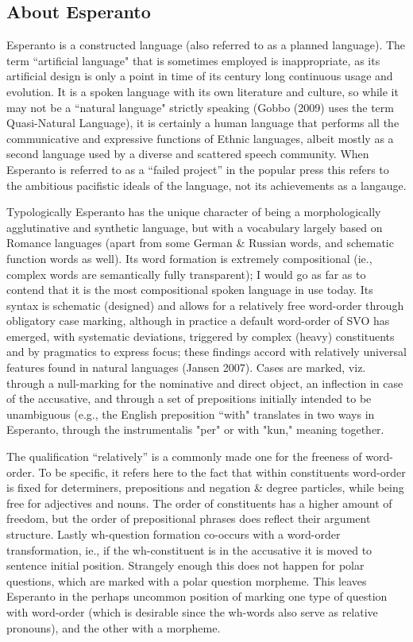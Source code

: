 \documentclass[10pt,a4paper]{article}
\begin{document}
\subsection{About Esperanto}

Esperanto is a constructed language (also referred to as a planned language).
The term ``artificial language" that is sometimes employed is inappropriate, as
its artificial design is only a point in time of its century long continuous
usage and evolution. It is a spoken language with its own literature and
culture, so while it may not  be a ``natural language" strictly speaking (Gobbo
(2009) uses the term Quasi-Natural Language), it is certainly a human language
that performs all the communicative and expressive functions of Ethnic
languages, albeit mostly as a second language used by a diverse and scattered
speech community. When Esperanto is referred to as a ``failed project'' in the
popular press this refers to the ambitious pacifistic ideals of the language, 
not its achievements as a langauge.

Typologically Esperanto has the unique character of being a morphologically
agglutinative and synthetic language, but with a vocabulary largely based on
Romance languages (apart from some German \& Russian words, and schematic
function words as well). Its word formation is extremely compositional (ie.,
complex words are semantically fully transparent); I would go as far as to
contend that it is the most compositional spoken language in use today. Its
syntax is schematic (designed) and allows for a relatively free word-order
through obligatory case marking, although in practice a default word-order of
SVO has emerged, with systematic deviations, triggered by complex (heavy)
constituents and by pragmatics to express focus; these findings accord with
relatively universal features found in natural languages (Jansen 2007). Cases
are marked, viz. through a null-marking for the nominative and direct object,
an inflection in case of the accusative, and through a set of prepositions
initially intended to be unambiguous (e.g., the English preposition ``with"
translates in two ways in Esperanto, through the instrumentalis "per" or with
"kun," meaning together. 

The qualification ``relatively'' is a commonly made one for the freeness of
word-order. To be specific, it refers here to the fact that within
constituents word-order is fixed for determiners, prepositions and negation
\& degree particles, while being free for adjectives and nouns. The order of
constituents has a higher amount of freedom, but the order of prepositional
phrases does reflect their argument structure. Lastly wh-question formation
co-occurs with a word-order transformation, ie., if the wh-constituent is in
the accusative it is moved to sentence initial position.  Strangely enough
this does not happen for polar questions, which are marked with a
polar question morpheme. This leaves Esperanto in the perhaps uncommon position
of marking one type of question with word-order (which is desirable since the
wh-words also serve as relative pronouns), and the other with a morpheme. 
\end{document}
